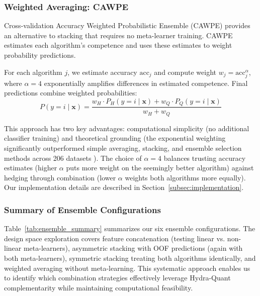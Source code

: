 \documentclass[pdflatex,sn-basic]{sn-jnl}           %
\theoremstyle{thmstyleone}%
\theoremstyle{thmstyletwo}%
\theoremstyle{thmstylethree}%
\begin{document}
\subsubsection{Weighted Averaging: CAWPE}

Cross-validation Accuracy Weighted Probabilistic Ensemble (CAWPE) \citep{cawpe} provides an alternative to stacking that requires no meta-learner training. CAWPE estimates each algorithm's competence and uses these estimates to weight probability predictions.

For each algorithm $j$, we estimate accuracy $\text{acc}_j$ and compute weight $w_j = \text{acc}_j^\alpha$, where $\alpha=4$ exponentially amplifies differences in estimated competence. Final predictions combine weighted probabilities:
\begin{equation}
P(y=i \mid \mathbf{x}) = \frac{w_H \cdot P_H(y=i \mid \mathbf{x}) + w_Q \cdot P_Q(y=i \mid \mathbf{x})}{w_H + w_Q}
\end{equation}

This approach has two key advantages: computational simplicity (no additional classifier training) and theoretical grounding (the exponential weighting significantly outperformed simple averaging, stacking, and ensemble selection methods across 206 datasets \citep{cawpe}). The choice of $\alpha=4$ balances trusting accuracy estimates (higher $\alpha$ puts more weight on the seemingly better algorithm) against hedging through combination (lower $\alpha$ weights both algorithms more equally). Our implementation details are described in Section~\ref{subsec:implementation}.

\subsubsection{Summary of Ensemble Configurations}

Table~\ref{tab:ensemble_summary} summarizes our six ensemble configurations. The design space exploration covers feature concatenation (testing linear vs. non-linear meta-learners), asymmetric stacking with OOF predictions (again with both meta-learners), symmetric stacking treating both algorithms identically, and weighted averaging without meta-learning. This systematic approach enables us to identify which combination strategies effectively leverage Hydra-Quant complementarity while maintaining computational feasibility.
\end{document}
